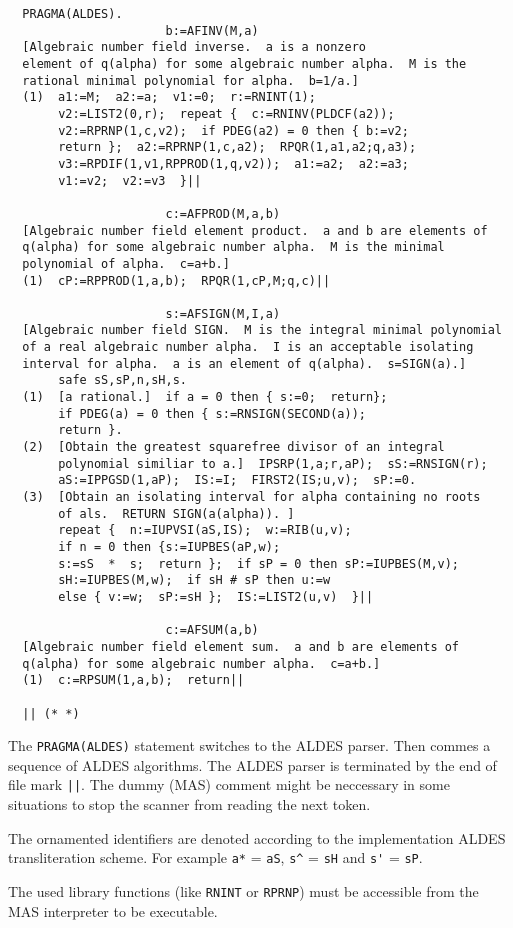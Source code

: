 {\small
\begin{verbatim}
  PRAGMA(ALDES).
                      b:=AFINV(M,a)
  [Algebraic number field inverse.  a is a nonzero
  element of q(alpha) for some algebraic number alpha.  M is the
  rational minimal polynomial for alpha.  b=1/a.]
  (1)  a1:=M;  a2:=a;  v1:=0;  r:=RNINT(1);
       v2:=LIST2(0,r);  repeat {  c:=RNINV(PLDCF(a2));
       v2:=RPRNP(1,c,v2);  if PDEG(a2) = 0 then { b:=v2;
       return };  a2:=RPRNP(1,c,a2);  RPQR(1,a1,a2;q,a3);
       v3:=RPDIF(1,v1,RPPROD(1,q,v2));  a1:=a2;  a2:=a3;
       v1:=v2;  v2:=v3  }||

                      c:=AFPROD(M,a,b)
  [Algebraic number field element product.  a and b are elements of
  q(alpha) for some algebraic number alpha.  M is the minimal 
  polynomial of alpha.  c=a+b.]
  (1)  cP:=RPPROD(1,a,b);  RPQR(1,cP,M;q,c)||

                      s:=AFSIGN(M,I,a)
  [Algebraic number field SIGN.  M is the integral minimal polynomial
  of a real algebraic number alpha.  I is an acceptable isolating 
  interval for alpha.  a is an element of q(alpha).  s=SIGN(a).]
       safe sS,sP,n,sH,s.
  (1)  [a rational.]  if a = 0 then { s:=0;  return};
       if PDEG(a) = 0 then { s:=RNSIGN(SECOND(a));
       return }.
  (2)  [Obtain the greatest squarefree divisor of an integral 
       polynomial similiar to a.]  IPSRP(1,a;r,aP);  sS:=RNSIGN(r);
       aS:=IPPGSD(1,aP);  IS:=I;  FIRST2(IS;u,v);  sP:=0.
  (3)  [Obtain an isolating interval for alpha containing no roots 
       of als.  RETURN SIGN(a(alpha)). ]
       repeat {  n:=IUPVSI(aS,IS);  w:=RIB(u,v);
       if n = 0 then {s:=IUPBES(aP,w);
       s:=sS  *  s;  return };  if sP = 0 then sP:=IUPBES(M,v);
       sH:=IUPBES(M,w);  if sH # sP then u:=w
       else { v:=w;  sP:=sH };  IS:=LIST2(u,v)  }||

                      c:=AFSUM(a,b)
  [Algebraic number field element sum.  a and b are elements of
  q(alpha) for some algebraic number alpha.  c=a+b.]
  (1)  c:=RPSUM(1,a,b);  return||

  || (* *)
\end{verbatim}
}

The \verb/PRAGMA(ALDES)/ statement switches to the 
ALDES parser. Then commes a sequence of ALDES algorithms.
The ALDES parser is terminated by the end of file mark \verb/||/. 
The dummy (MAS) comment might be neccessary in some situations 
to stop the scanner from reading the next token. 

The ornamented identifiers are denoted according to the 
implementation ALDES transliteration scheme.
For example \verb/a*/ = \verb/aS/,
\verb/s^/ = \verb/sH/ and \verb/s'/ = \verb/sP/.

The used library functions (like \verb/RNINT/ or \verb/RPRNP/)
must be accessible from the MAS interpreter to be executable.

